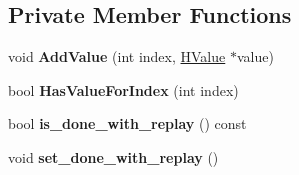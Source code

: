 \subsection*{Private Member Functions}
\begin{DoxyCompactItemize}
\item 
void {\bfseries Add\+Value} (int index, \hyperlink{classv8_1_1internal_1_1_h_value}{H\+Value} $\ast$value)\hypertarget{classv8_1_1internal_1_1_h_simulate_a7eb15c7b649e2ca242f5bad79e4b05a0}{}\label{classv8_1_1internal_1_1_h_simulate_a7eb15c7b649e2ca242f5bad79e4b05a0}

\item 
bool {\bfseries Has\+Value\+For\+Index} (int index)\hypertarget{classv8_1_1internal_1_1_h_simulate_a9b2d30a95677ecffe65e8b194160c44f}{}\label{classv8_1_1internal_1_1_h_simulate_a9b2d30a95677ecffe65e8b194160c44f}

\item 
bool {\bfseries is\+\_\+done\+\_\+with\+\_\+replay} () const \hypertarget{classv8_1_1internal_1_1_h_simulate_a6b0aab286d5e6db3040193ca77c6be26}{}\label{classv8_1_1internal_1_1_h_simulate_a6b0aab286d5e6db3040193ca77c6be26}

\item 
void {\bfseries set\+\_\+done\+\_\+with\+\_\+replay} ()\hypertarget{classv8_1_1internal_1_1_h_simulate_ad51ba1d239507d9a80fe8448ed5df5e6}{}\label{classv8_1_1internal_1_1_h_simulate_ad51ba1d239507d9a80fe8448ed5df5e6}

\end{DoxyCompactItemize}
